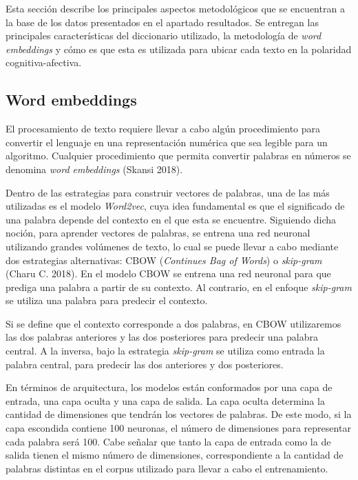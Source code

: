 \documentclass[
  12pt,
]{article}
\begin{document}
Esta sección describe los principales aspectos metodológicos que se
encuentran a la base de los datos presentados en el apartado resultados.
Se entregan las principales características del diccionario utilizado,
la metodología de \emph{word embeddings} y cómo es que esta es utilizada
para ubicar cada texto en la polaridad cognitiva-afectiva.

\hypertarget{word-embeddings}{%
\subsection{\texorpdfstring{Word embeddings
\label{word_emb}}{Word embeddings }}\label{word-embeddings}}

El procesamiento de texto requiere llevar a cabo algún procedimiento
para convertir el lenguaje en una representación numérica que sea
legible para un algoritmo. Cualquier procedimiento que permita convertir
palabras en números se denomina \emph{word embeddings} (Skansi 2018).

Dentro de las estrategias para construir vectores de palabras, una de
las más utilizadas es el modelo \emph{Word2vec}, cuya idea fundamental
es que el significado de una palabra depende del contexto en el que esta
se encuentre. Siguiendo dicha noción, para aprender vectores de
palabras, se entrena una red neuronal utilizando grandes volúmenes de
texto, lo cual se puede llevar a cabo mediante dos estrategias
alternativas: CBOW (\emph{Continues Bag of Words}) o \emph{skip-gram}
(Charu C. 2018). En el modelo CBOW se entrena una red neuronal para que
prediga una palabra a partir de su contexto. Al contrario, en el enfoque
\emph{skip-gram} se utiliza una palabra para predecir el contexto.

Si se define que el contexto corresponde a dos palabras, en CBOW
utilizaremos las dos palabras anteriores y las dos posteriores para
predecir una palabra central. A la inversa, bajo la estrategia
\emph{skip-gram} se utiliza como entrada la palabra central, para
predecir las dos anteriores y dos posteriores.

En términos de arquitectura, los modelos están conformados por una capa
de entrada, una capa oculta y una capa de salida. La capa oculta
determina la cantidad de dimensiones que tendrán los vectores de
palabras. De este modo, si la capa escondida contiene 100 neuronas, el
número de dimensiones para representar cada palabra será 100. Cabe
señalar que tanto la capa de entrada como la de salida tienen el mismo
número de dimensiones, correspondiente a la cantidad de palabras
distintas en el corpus utilizado para llevar a cabo el entrenamiento.
\end{document}
